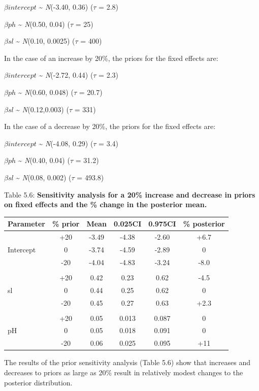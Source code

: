 \documentclass[
]{book}
\begin{document}
\(\beta intercept\) \textasciitilde{} \emph{N}(-3.40, 0.36) (\(\tau\) = 2.8)

\(\beta ph\) \textasciitilde{} \emph{N}(0.50, 0.04) (\(\tau\) = 25)

\(\beta sl\) \textasciitilde{} \emph{N}(0.10, 0.0025) (\(\tau\) = 400)

In the case of an increase by 20\%, the priors for the fixed effects are:

\(\beta intercept\) \textasciitilde{} \emph{N}(-2.72, 0.44) (\(\tau\) = 2.3)

\(\beta ph\) \textasciitilde{} \emph{N}(0.60, 0.048) (\(\tau\) = 20.7)

\(\beta sl\) \textasciitilde{} \emph{N}(0.12,0.003) (\(\tau\) = 331)

In the case of a decrease by 20\%, the priors for the fixed effects are:

\(\beta intercept\) \textasciitilde{} \emph{N}(-4.08, 0.29) (\(\tau\) = 3.4)

\(\beta ph\) \textasciitilde{} \emph{N}(0.40, 0.04) (\(\tau\) = 31.2)

\(\beta sl\) \textasciitilde{} \emph{N}(0.08, 0.002) (\(\tau\) = 493.8)

Table 5.6: \textbf{Sensitivity analysis for a 20\% increase and decrease in priors on fixed effects and the \% change in the posterior mean.}

\begin{longtable}[]{@{}lccccc@{}}
\toprule
Parameter & \% prior & Mean & 0.025CI & 0.975CI & \% posterior \\
\midrule
\endhead
& +20 & -3.49 & -4.38 & -2.60 & +6.7 \\
Intercept & 0 & -3.74 & -4.59 & -2.89 & 0 \\
& -20 & -4.04 & -4.83 & -3.24 & -8.0 \\
& & & & & \\
& +20 & 0.42 & 0.23 & 0.62 & -4.5 \\
sl & 0 & 0.44 & 0.25 & 0.62 & 0 \\
& -20 & 0.45 & 0.27 & 0.63 & +2.3 \\
& & & & & \\
& +20 & 0.05 & 0.013 & 0.087 & 0 \\
pH & 0 & 0.05 & 0.018 & 0.091 & 0 \\
& -20 & 0.06 & 0.025 & 0.095 & +11 \\
\bottomrule
\end{longtable}

The results of the prior sensitivity analysis (Table 5.6) show that increases and decreases to priors as large as 20\% result in relatively modest changes to the posterior distribution.
\end{document}
